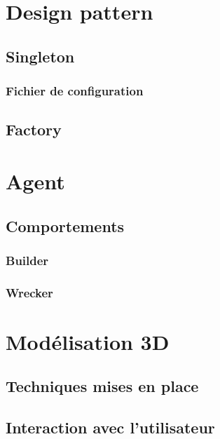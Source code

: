 \section{Design pattern}

\subsection{Singleton}

\subsubsection{Fichier de configuration}

\subsection{Factory}


\section{Agent}

\subsection{Comportements}

\subsubsection{Builder}

\subsubsection{Wrecker}


\section{Modélisation 3D}

\subsection{Techniques mises en place}


\subsection{Interaction avec l'utilisateur}

